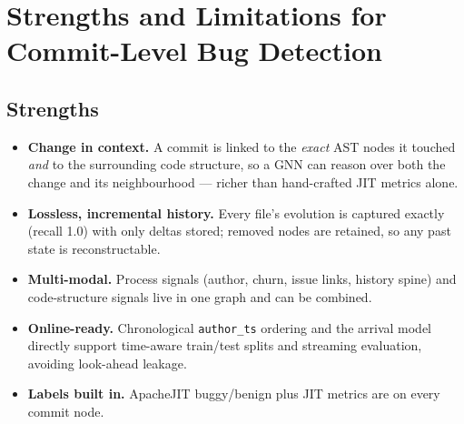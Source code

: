 \documentclass[11pt,a4paper]{article}
\newcommand{\code}[1]{\texttt{#1}}
\begin{document}
	\section{Strengths and Limitations for Commit-Level Bug Detection}\label{sec:limits}
	\subsection*{Strengths}
	\begin{itemize}[nosep]
		\item \textbf{Change in context.} A commit is linked to the \emph{exact} AST
		nodes it touched \emph{and} to the surrounding code structure, so a GNN
		can reason over both the change and its neighbourhood --- richer than
		hand-crafted JIT metrics alone.
		\item \textbf{Lossless, incremental history.} Every file's evolution is
		captured exactly (recall 1.0) with only deltas stored; removed nodes are
		retained, so any past state is reconstructable.
		\item \textbf{Multi-modal.} Process signals (author, churn, issue links,
		history spine) and code-structure signals live in one graph and can be
		combined.
		\item \textbf{Online-ready.} Chronological \code{author\_ts} ordering and the
		arrival model directly support time-aware train/test splits and
		streaming evaluation, avoiding look-ahead leakage.
		\item \textbf{Labels built in.} ApacheJIT buggy/benign plus JIT metrics are on
		every commit node.
	\end{itemize}
	
\end{document}
